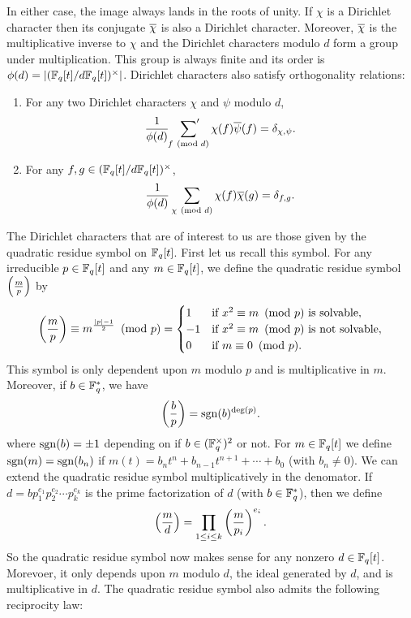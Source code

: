         In either case, the image always lands in the roots of unity. If $\chi$ is a Dirichlet character then its conjugate $\overline{\chi}$ is also a Dirichlet character. Moreover, $\overline{\chi}$ is the multiplicative inverse to $\chi$ and the Dirichlet characters modulo $d$ form a group under multiplication. This group is always finite and its order is $\phi(d) = |(\mathbb{F}_{q}[t]/d\mathbb{F}_{q}[t])^{\times}|$. Dirichlet characters also satisfy orthogonality relations:

        \begin{theorem}
            \phantom{ }
            \begin{enumerate}[label=(\roman*)]
            \item For any two Dirichlet characters $\chi$ and $\psi$ modulo $d$,
            \[
                \frac{1}{\phi(d)}\sideset{}{'}\sum_{f \ \left(\text{mod }d\right)}\chi(f)\overline{\psi}(f) = \delta_{\chi,\psi}.
            \]
            \item For any $f,g \in (\mathbb{F}_{q}[t]/d\mathbb{F}_{q}[t])^{\times}$,
            \[
                \frac{1}{\phi(d)}\sum_{\chi \ \left(\text{mod }d\right)}\chi(f)\overline{\chi}(g) = \delta_{f,g}.
            \]
            \end{enumerate}
        \end{theorem}

        The Dirichlet characters that are of interest to us are those given by the quadratic residue symbol on $\mathbb{F}_{q}[t]$. First let us recall this symbol. For any irreducible $p \in \mathbb{F}_{q}[t]$ and any $m \in \mathbb{F}_{q}[t]$, we define the quadratic residue symbol $\textstyle{\left(\frac{m}{p}\right)}$ by
        \[
            \left(\frac{m}{p}\right) \equiv m^{\frac{|p|-1}{2}} \ \left(\text{mod }p\right) = \begin{cases} 1 & \text{if $x^{2} \equiv m \ \left(\text{mod }p\right)$ is solvable}, \\ -1 & \text{if $x^{2} \equiv m \ \left(\text{mod }p\right)$ is not solvable}, \\ 0 & \text{if $m \equiv 0 \ \left(\text{mod }p\right)$}. \end{cases}
        \]
        This symbol is only dependent upon $m$ modulo $p$ and is multiplicative in $m$. Moreover, if $b \in \mathbb{F}_{q}^{\ast}$, we have
        \[
            \left(\frac{b}{p}\right) = \operatorname{\mathrm{sgn}}(b)^{\deg(p)}.
        \]
        where $\operatorname{\mathrm{sgn}}(b) = \pm1$ depending on if $b \in (\mathbb{F}_{q}^{\times})^{2}$ or not. For $m \in \mathbb{F}_{q}[t]$ we define $\operatorname{\mathrm{sgn}}(m) = \operatorname{\mathrm{sgn}}(b_{n})$ if $m(t) = b_{n}t^{n}+b_{n-1}t^{n+1}+\cdots+b_{0}$ (with $b_{n} \neq 0$). We can extend the quadratic residue symbol multiplicatively in the denomator. If $d = bp_{1}^{e_{1}}p_{2}^{e_{2}} \cdots p_{k}^{e_{k}}$ is the prime factorization of $d$ (with $b \in \mathbb{F}_{q}^{\ast}$), then we define
        \[
            \left(\frac{m}{d}\right) = \prod_{1 \le i \le k}\left(\frac{m}{p_{i}}\right)^{e_{i}}.
        \]
        So the quadratic residue symbol now makes sense for any nonzero $d \in \mathbb{F}_{q}[t]$. Morevoer, it only depends upon $m$ modulo $d$, the ideal generated by $d$, and is multiplicative in $d$. The quadratic residue symbol also admits the following reciprocity law:

